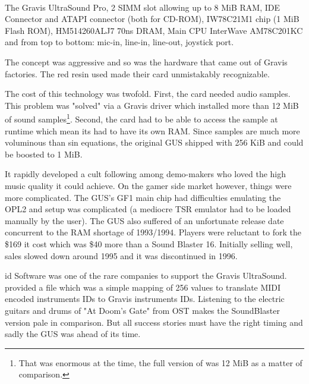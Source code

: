 \\
\par
The Gravis UltraSound Pro,  2 SIMM slot allowing up to 8 MiB RAM,  IDE Connector and  ATAPI connector (both for CD-ROM),  IW78C21M1 chip (1 MiB Flash ROM),  HM514260ALJ7 70ns DRAM,  Main CPU InterWave AM78C201KC and  from top to bottom: mic-in, line-in, line-out, joystick port.\\

The concept was aggressive and so was the hardware that came out of Gravis factories. The red resin used made their card unmistakably recognizable.\\
\par
The cost of this technology was twofold. First, the card needed audio samples. This problem was "solved" via a Gravis driver which installed more than 12 MiB of sound samples\footnote{That was enormous at the time, the full version of \doom{} was 12 MiB as a matter of comparison.}. Second, the card had to be able to access the sample at runtime which mean its had to have its own RAM. Since samples are much more voluminous than sin equations, the original GUS shipped with 256 KiB and could be boosted to 1 MiB.\\
\par
It rapidly developed a cult following among demo-makers who loved the high music quality it could achieve. On the gamer side market however, things were more complicated. The GUS's GF1 main chip had difficulties emulating the OPL2 and setup was complicated (a mediocre TSR emulator had to be loaded manually by the user). The GUS also suffered of an unfortunate release date concurrent to the RAM shortage of 1993/1994. Players were reluctant to fork the \$169 it cost which was \$40 more than a Sound Blaster 16. Initially selling well, sales slowed down around 1995 and it was discontinued in 1996.\\
\par
 id Software was one of the rare companies to support the Gravis UltraSound. \doom{} provided a  file which was a simple mapping of 256 values to translate MIDI encoded instruments IDs to Gravis instruments IDs. Listening to the electric guitars and drums of "At Doom's Gate" from \doom{} OST makes the SoundBlaster version pale in comparison. But all success stories must have the right timing and sadly the GUS was ahead of its time.

